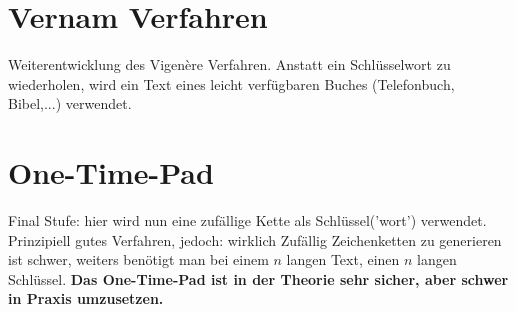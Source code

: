 \section{Vernam Verfahren}
Weiterentwicklung des Vigenère Verfahren. Anstatt ein Schlüsselwort zu wiederholen, wird ein Text eines leicht verfügbaren Buches (Telefonbuch, Bibel,...) verwendet. 

\section{One-Time-Pad}
Final Stufe: hier wird nun eine zufällige Kette als Schlüssel('wort') verwendet. Prinzipiell gutes Verfahren, jedoch: wirklich Zufällig Zeichenketten zu generieren ist schwer, weiters benötigt man bei einem $n$ langen Text, einen $n$ langen Schlüssel.
\textbf{Das One-Time-Pad ist in der Theorie sehr sicher, aber schwer in Praxis umzusetzen.}
